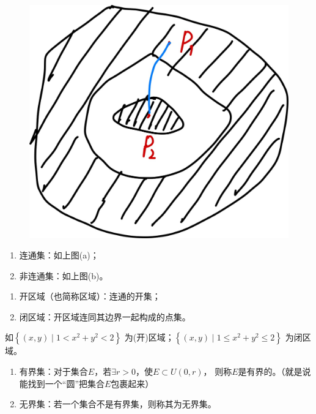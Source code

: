 \documentclass[12pt, a4paper]{article}
\numberwithin{equation}{section}
\begin{document}
\begin{figure}[htbp]
{\begin{minipage}[b]{.3\linewidth}
                \includegraphics[scale=0.08]{"Chapter 09 images/pic2.jpg"}
            \end{minipage}
        }
    \end{figure}

    \begin{enumerate}
        \item 连通集：如上图(a)；
        \item 非连通集：如上图(b)。
    \end{enumerate}

    \begin{enumerate}
        \item 开区域（也简称区域）：连通的开集；
        \item 闭区域：开区域连同其边界一起构成的点集。
    \end{enumerate}

    如\(\left\{\left(x,y\right) \mid 1 < x^2+y^2 < 2\right\}\)
    为(开)区域；\(\left\{\left(x,y\right) \mid 1 \leq x^2+y^2 \leq 2\right\}\)
    为闭区域。

    \begin{enumerate}
        \item 有界集：对于集合\(E\)，若\(\exists r > 0\)，使\(E \subset U\left(0,r\right)\)，
            则称\(E\)是有界的。（就是说能找到一个“圆”把集合\(E\)包裹起来）
        \item 无界集：若一个集合不是有界集，则称其为无界集。
    \end{enumerate}
\end{document}
